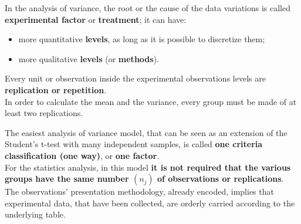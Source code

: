 \begin{frame}
  \vspace*{.25cm}
  In the analysis of variance, the root or the cause of the data variations is called \textbf{experimental factor} or \textbf{treatment}; it can have:
  \vspace*{.25cm}
  \begin{itemize}
    \item more quantitative \textbf{levels}, as long as it is possible to discretize them;
    \vspace*{.25cm}
    \item more qualitative \textbf{levels} (or \textbf{methods}).
  \end{itemize}
  \vspace*{.25cm}
  Every unit or observation inside the experimental observations levels are \textbf{replication or repetition}.\\
  \vspace*{.25cm}
  In order to calculate the mean and the variance, every group must be made of at least two replications.
\end{frame}




\begin{frame}
  \vspace*{.5cm}
  The easiest analysis of variance model, that can be seen as an extension of the Student's t-test with many independent samples, is called \textbf{one criteria classification (one way)}, or \textbf{one factor}.\\
  \vspace*{.75cm}
  For the statistics analysis, in this model \textbf{it is not required that the various groups have the same number {\boldmath $ (n_j) $} of observations or replications}.\\
  \vspace*{.75cm}
  The observations' presentation methodology, already encoded, implies that experimental data, that have been collected, are orderly carried according to the underlying table.
\end{frame}

